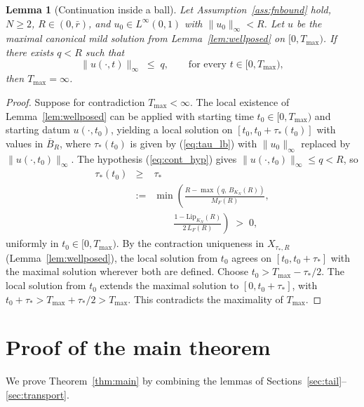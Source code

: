 \documentclass[10pt,a4paper]{amsart}
\newtheorem{lemma}{Lemma}
\newcommand{\Linf}{L^\infty}
\newcommand{\LipKn}{\mathrm{Lip}_{K_N}}
\begin{document}
\begin{lemma}[Continuation inside a ball]\label{lem:continuation}
Let Assumption~\ref{ass:fnbound} hold, $N \ge 2$, $R \in (0, \bar r)$, and $u_0 \in \Linf(0,1)$ with $\|u_0\|_\infty < R$. Let $u$ be the maximal canonical mild solution from Lemma~\ref{lem:wellposed} on $[0, T_{\max})$. If there exists $q < R$ such that
\begin{equation}
\|u(\cdot, t)\|_\infty \;\le\; q, \qquad \text{for every } t \in [0, T_{\max}),
\label{eq:cont_hyp}
\end{equation}
then $T_{\max} = \infty$.
\end{lemma}

\begin{proof}
Suppose for contradiction $T_{\max} < \infty$. The local existence of Lemma~\ref{lem:wellposed} can be applied with starting time $t_0 \in [0, T_{\max})$ and starting datum $u(\cdot, t_0)$, yielding a local solution on $[t_0, t_0 + \tau_*(t_0)]$ with values in $\overline B_R$, where $\tau_*(t_0)$ is given by (\ref{eq:tau_lb}) with $\|u_0\|_\infty$ replaced by $\|u(\cdot, t_0)\|_\infty$. The hypothesis (\ref{eq:cont_hyp}) gives $\|u(\cdot, t_0)\|_\infty \le q < R$, so
\begin{eqnarray}
\tau_*(t_0) &\ge& \tau_* \nonumber \\
&:=& \min\!\left(\frac{R - \max(q,\, B_{K_N}(R))}{M_F(R)},\right. \nonumber \\
&& \quad\quad \left.\frac{1 - \LipKn(R)}{2\, L_F(R)}\right) \;>\; 0,
\label{eq:tau_uniform_lb}
\end{eqnarray}
uniformly in $t_0 \in [0, T_{\max})$. By the contraction uniqueness in $X_{\tau_*, R}$ (Lemma~\ref{lem:wellposed}), the local solution from $t_0$ agrees on $[t_0, t_0 + \tau_*]$ with the maximal solution wherever both are defined. Choose $t_0 > T_{\max} - \tau_*/2$. The local solution from $t_0$ extends the maximal solution to $[0, t_0 + \tau_*]$, with $t_0 + \tau_* > T_{\max} + \tau_*/2 > T_{\max}$. This contradicts the maximality of $T_{\max}$.
\end{proof}

\section{Proof of the main theorem}\label{sec:mainproof}

We prove Theorem~\ref{thm:main} by combining the lemmas of Sections~\ref{sec:tail}--\ref{sec:transport}.
\end{document}
